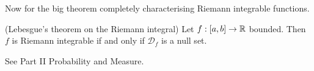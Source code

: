 \documentclass{article}
\begin{document}
Now for the big theorem completely characterising Riemann integrable functions.
\begin{theorem}
	(Lebesgue's theorem on the Riemann integral) Let $ f:[a,b]\to\mathbb{R} $ bounded. Then $ f $ is Riemann integrable if and only if $ \mathcal D_f $ is a null set.
\end{theorem}
\pf See Part II Probability and Measure.
\end{document}
